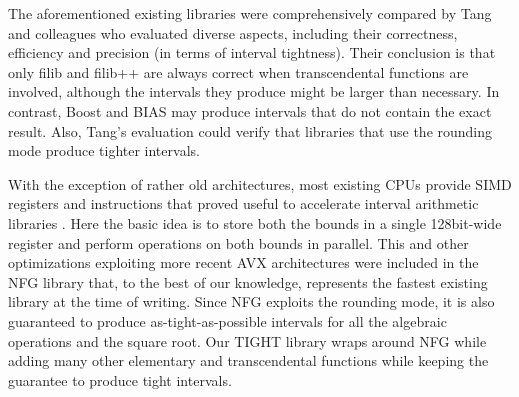 The aforementioned existing libraries were comprehensively compared by Tang and colleagues \cite{tang2022} who evaluated diverse aspects, including their correctness, efficiency and precision (in terms of interval tightness). Their conclusion is that only filib and filib++ are always correct when transcendental functions are involved, although the intervals they produce might be larger than necessary. In contrast, Boost and BIAS may produce intervals that do not contain the exact result. Also, Tang's evaluation could verify that libraries that use the rounding mode produce tighter intervals.

With the exception of rather old architectures, most existing CPUs provide SIMD registers and instructions that proved useful to accelerate interval arithmetic libraries \cite{lambov2008}. Here the basic idea is to store both the bounds in a single 128bit-wide register and perform operations on both bounds in parallel. This and other optimizations exploiting more recent AVX architectures were  included in the NFG library \cite{nfg} that, to the best of our knowledge, represents the fastest existing library at the time of writing. Since NFG exploits the rounding mode, it is also guaranteed to produce as-tight-as-possible intervals for all the algebraic operations and the square root. Our TIGHT library wraps around NFG while adding many other elementary and transcendental functions while keeping the guarantee to produce tight intervals.
